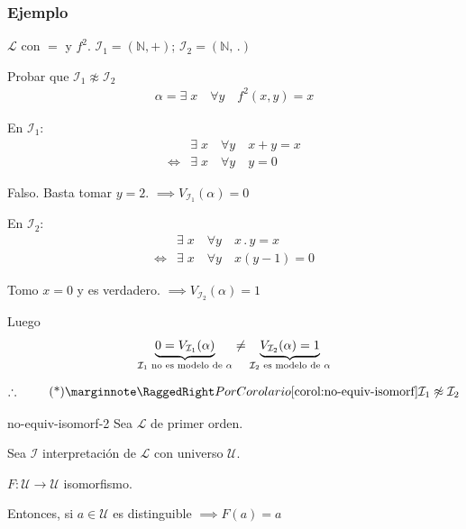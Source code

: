 \subsubsection{Ejemplo}

$\mathcal{L}$ con $=$ y $f^2$. 
$\mathcal{I}_1 = (\mathbb{N}, +)$; $\mathcal{I}_2 = (\mathbb{N}, \, .)$

Probar que $\mathcal{I}_1 \not\approx \mathcal{I}_2$
\begin{gather*}
    \alpha = \exists \; x \quad \forall y \quad f^2 (x,y) = x
\end{gather*}

En $\mathcal{I}_1$:
\begin{align*}
    & \exists \; x \quad \forall y \quad x+y = x \\
    \iff & \exists \; x \quad \forall y \quad y = 0
\end{align*}

Falso. Basta tomar $y = 2$. $\implies V_{\mathcal{I}_1}(\alpha) = 0$

En $\mathcal{I}_2$:
\begin{align*}
    & \exists \; x \quad \forall y \quad x \, . \, y = x \\
    \iff & \exists \; x \quad \forall y \quad x(y-1) = 0
\end{align*}

Tomo $x = 0$ y es verdadero. $\implies V_{\mathcal{I}_2}(\alpha) = 1$

Luego
\begin{gather*}
    \underbrace{0 = V_{\mathcal{I}_1} (\alpha)}_{%
    \mathcal{I}_1 \text{ no es modelo de } \alpha}
    \neq 
    \underbrace{V_{\mathcal{I}_2} (\alpha) = 1}_{%
    \mathcal{I}_2 \text{ es modelo de } \alpha}
\end{gather*}

\begin{gather*}
    \therefore ~ \notamath{Por Corolario \ref{corol:no-equiv-isomorf} }
    \mathcal{I}_1 \not\approx \mathcal{I}_2
\end{gather*}

\medskip

\begin{corolario}{}{no-equiv-isomorf-2}
    Sea $\mathcal{L}$ de primer orden.

    Sea $\mathcal{I}$ interpretación de $\mathcal{L}$ 
    con universo $\mathcal{U}$.

    $F: \mathcal{U} \to \mathcal{U}$ isomorfismo.

    \medskip

    Entonces, si $a \in \mathcal{U}$ es distinguible $\implies F(a) = a$
\end{corolario}

